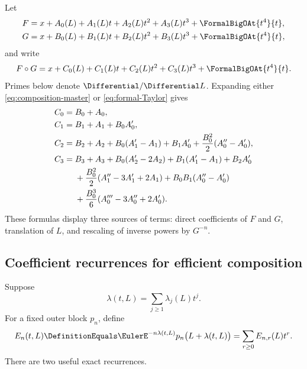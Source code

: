 \documentclass[11pt]{article}
\theoremstyle{pltheorem}
\newcommand{\compose}{\mathbin{\circ}}
\begin{document}
Let
\begin{align}
 F&=x+A_0(L)+A_1(L)t+A_2(L)t^2+A_3(L)t^3+\FormalBigOAt{t^4}{t},
 \label{eq:F-near-low}\\
 G&=x+B_0(L)+B_1(L)t+B_2(L)t^2+B_3(L)t^3+\FormalBigOAt{t^4}{t},
 \label{eq:G-near-low}
\end{align}
and write
\begin{equation}\label{eq:H-near-low}
 F\compose G=x+C_0(L)+C_1(L)t+C_2(L)t^2+C_3(L)t^3+\FormalBigOAt{t^4}{t}.
\end{equation}
Primes below denote \(\Differential/\Differential L\).  Expanding either
\cref{eq:composition-master} or \cref{eq:formal-Taylor} gives
\begin{align}
 C_0={}&B_0+A_0,\label{eq:C0-compose}\\
 C_1={}&B_1+A_1+B_0A_0',\label{eq:C1-compose}\\
 C_2={}&B_2+A_2+B_0(A_1'-A_1)+B_1A_0'
 +\frac{B_0^2}{2}(A_0''-A_0'),\label{eq:C2-compose}\\
 C_3={}&B_3+A_3+B_0(A_2'-2A_2)+B_1(A_1'-A_1)+B_2A_0'
 \notag\\
 &+\frac{B_0^2}{2}(A_1''-3A_1'+2A_1)
 +B_0B_1(A_0''-A_0')\notag\\
 &+\frac{B_0^3}{6}(A_0'''-3A_0''+2A_0').
 \label{eq:C3-compose}
\end{align}
These formulas display three sources of terms: direct coefficients of \(F\) and \(G\), translation of \(L\), and rescaling of inverse powers by \(G^{-n}\).

\subsection{Coefficient recurrences for efficient composition}

Suppose
\begin{equation}\label{eq:lambda-coefficients}
 \lambda(t,L)=\sum_{j\ge1}\lambda_j(L)t^j.
\end{equation}
For a fixed outer block \(p_n\), define
\begin{equation}\label{eq:E-n-r-def}
 E_n(t,L)\DefinitionEquals\EulerE^{-n\lambda(t,L)}p_n\bigl(L+\lambda(t,L)\bigr)
 =\sum_{r\ge0}E_{n,r}(L)t^r.
\end{equation}
There are two useful exact recurrences.
\end{document}
